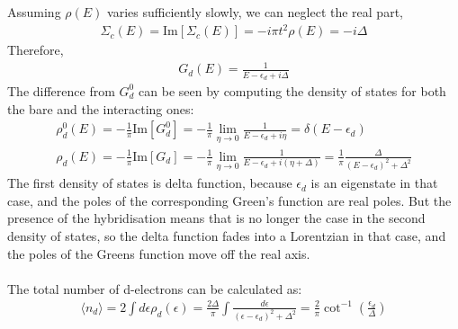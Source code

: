 \documentclass[twoside,11pt]{report}
\numberwithin{equation}{section}
\begin{document}
Assuming \(\rho(E)\) varies sufficiently slowly, we can neglect the real part,
\begin{equation}\begin{aligned}
	\Sigma_c(E) = \text{Im}\left[\Sigma_c(E)\right] = -i\pi t^2 \rho(E) = -i\Delta
\end{aligned}\end{equation}
Therefore,
\begin{equation}\begin{aligned}
G_d(E) = \frac{1}{E-\epsilon_d+i\Delta}
\end{aligned}\end{equation}
The difference from \(G^0_d\) can be seen by computing the density of states for both the bare and the interacting ones:
\begin{gather}
	\rho_d^0(E) = -\frac{1}{\pi}\text{Im}\left[G^0_d\right] = -\frac{1}{\pi} \lim_{\eta \rightarrow 0} \frac{1}{E - \epsilon_d + i\eta} = \delta(E - \epsilon_d)\\
	\rho_d(E) = -\frac{1}{\pi}\text{Im}\left[G_d\right]= -\frac{1}{\pi} \lim_{\eta \rightarrow 0} \frac{1}{E - \epsilon_d + i(\eta+\Delta)} = \frac{1}{\pi}\frac{\Delta}{(E-\epsilon_d)^2 + \Delta^2}\label{densitys}
\end{gather}
The first density of states is delta function, because \(\epsilon_d\) is an eigenstate in that case, and the poles of the corresponding Green's function are real poles.
But the presence of the hybridisation means that is no longer the case in the second density of states, so the delta function fades into a Lorentzian in that case, and the poles of the Greens function move off the real axis.
\\\\The total number of d-electrons can be calculated as:
\begin{equation}\begin{aligned}
	\label{total}
	\langle  n_d\rangle = 2\int d\epsilon \rho_d(\epsilon) = \frac{2\Delta}{\pi} \int \frac{d\epsilon}{(\epsilon-\epsilon_d)^2 + \Delta^2} = \frac{2}{\pi}\cot^{-1}\left(\frac{\epsilon_d}{\Delta}\right)
\end{aligned}\end{equation}
\end{document}
